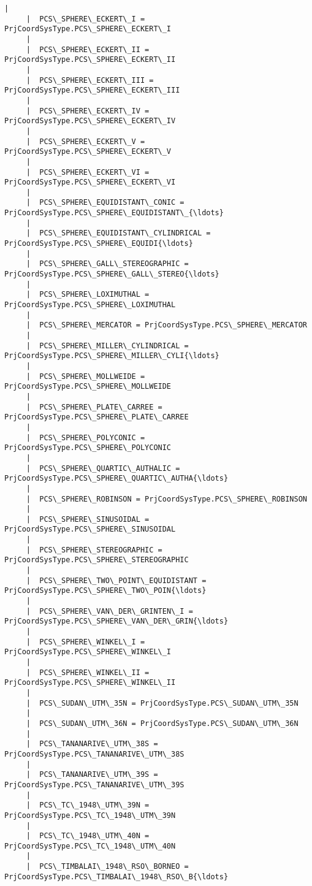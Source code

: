 \documentclass[11pt]{article}
\begin{document}
\begin{Verbatim}[commandchars=\\\{\}]
     |  
     |  PCS\_SPHERE\_ECKERT\_I = PrjCoordSysType.PCS\_SPHERE\_ECKERT\_I
     |  
     |  PCS\_SPHERE\_ECKERT\_II = PrjCoordSysType.PCS\_SPHERE\_ECKERT\_II
     |  
     |  PCS\_SPHERE\_ECKERT\_III = PrjCoordSysType.PCS\_SPHERE\_ECKERT\_III
     |  
     |  PCS\_SPHERE\_ECKERT\_IV = PrjCoordSysType.PCS\_SPHERE\_ECKERT\_IV
     |  
     |  PCS\_SPHERE\_ECKERT\_V = PrjCoordSysType.PCS\_SPHERE\_ECKERT\_V
     |  
     |  PCS\_SPHERE\_ECKERT\_VI = PrjCoordSysType.PCS\_SPHERE\_ECKERT\_VI
     |  
     |  PCS\_SPHERE\_EQUIDISTANT\_CONIC = PrjCoordSysType.PCS\_SPHERE\_EQUIDISTANT\_{\ldots}
     |  
     |  PCS\_SPHERE\_EQUIDISTANT\_CYLINDRICAL = PrjCoordSysType.PCS\_SPHERE\_EQUIDI{\ldots}
     |  
     |  PCS\_SPHERE\_GALL\_STEREOGRAPHIC = PrjCoordSysType.PCS\_SPHERE\_GALL\_STEREO{\ldots}
     |  
     |  PCS\_SPHERE\_LOXIMUTHAL = PrjCoordSysType.PCS\_SPHERE\_LOXIMUTHAL
     |  
     |  PCS\_SPHERE\_MERCATOR = PrjCoordSysType.PCS\_SPHERE\_MERCATOR
     |  
     |  PCS\_SPHERE\_MILLER\_CYLINDRICAL = PrjCoordSysType.PCS\_SPHERE\_MILLER\_CYLI{\ldots}
     |  
     |  PCS\_SPHERE\_MOLLWEIDE = PrjCoordSysType.PCS\_SPHERE\_MOLLWEIDE
     |  
     |  PCS\_SPHERE\_PLATE\_CARREE = PrjCoordSysType.PCS\_SPHERE\_PLATE\_CARREE
     |  
     |  PCS\_SPHERE\_POLYCONIC = PrjCoordSysType.PCS\_SPHERE\_POLYCONIC
     |  
     |  PCS\_SPHERE\_QUARTIC\_AUTHALIC = PrjCoordSysType.PCS\_SPHERE\_QUARTIC\_AUTHA{\ldots}
     |  
     |  PCS\_SPHERE\_ROBINSON = PrjCoordSysType.PCS\_SPHERE\_ROBINSON
     |  
     |  PCS\_SPHERE\_SINUSOIDAL = PrjCoordSysType.PCS\_SPHERE\_SINUSOIDAL
     |  
     |  PCS\_SPHERE\_STEREOGRAPHIC = PrjCoordSysType.PCS\_SPHERE\_STEREOGRAPHIC
     |  
     |  PCS\_SPHERE\_TWO\_POINT\_EQUIDISTANT = PrjCoordSysType.PCS\_SPHERE\_TWO\_POIN{\ldots}
     |  
     |  PCS\_SPHERE\_VAN\_DER\_GRINTEN\_I = PrjCoordSysType.PCS\_SPHERE\_VAN\_DER\_GRIN{\ldots}
     |  
     |  PCS\_SPHERE\_WINKEL\_I = PrjCoordSysType.PCS\_SPHERE\_WINKEL\_I
     |  
     |  PCS\_SPHERE\_WINKEL\_II = PrjCoordSysType.PCS\_SPHERE\_WINKEL\_II
     |  
     |  PCS\_SUDAN\_UTM\_35N = PrjCoordSysType.PCS\_SUDAN\_UTM\_35N
     |  
     |  PCS\_SUDAN\_UTM\_36N = PrjCoordSysType.PCS\_SUDAN\_UTM\_36N
     |  
     |  PCS\_TANANARIVE\_UTM\_38S = PrjCoordSysType.PCS\_TANANARIVE\_UTM\_38S
     |  
     |  PCS\_TANANARIVE\_UTM\_39S = PrjCoordSysType.PCS\_TANANARIVE\_UTM\_39S
     |  
     |  PCS\_TC\_1948\_UTM\_39N = PrjCoordSysType.PCS\_TC\_1948\_UTM\_39N
     |  
     |  PCS\_TC\_1948\_UTM\_40N = PrjCoordSysType.PCS\_TC\_1948\_UTM\_40N
     |  
     |  PCS\_TIMBALAI\_1948\_RSO\_BORNEO = PrjCoordSysType.PCS\_TIMBALAI\_1948\_RSO\_B{\ldots}

\end{Verbatim}
\end{document}

